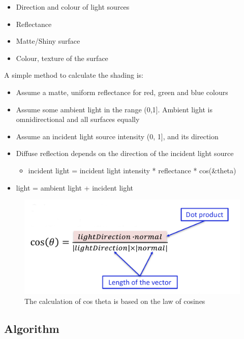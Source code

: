 \documentclass[
]{book}
\providecommand{\tightlist}{%
  \setlength{\itemsep}{0pt}\setlength{\parskip}{0pt}}
\begin{document}
\begin{itemize}
\tightlist
\item
  Direction and colour of light sources
\item
  Reflectance
\item
  Matte/Shiny surface
\item
  Colour, texture of the surface
\end{itemize}

A simple method to calculate the shading is:

\begin{itemize}
\tightlist
\item
  Assume a matte, {uniform reflectance} for red, green and blue colours
\item
  Assume some {ambient light} in the range (0,1{]}. Ambient light is omnidirectional and all surfaces equally
\item
  Assume an incident {light source} intensity (0, 1{]}, and its direction
\item
  Diffuse reflection depends on the direction of the incident light source

  \begin{itemize}
  \tightlist
  \item
    {incident light = incident light intensity * reflectance * cos(\&theta)}
  \end{itemize}
\item
  {light = ambient light + incident light}
\end{itemize}

\begin{figure}
\centering
\includegraphics{img/08-image28.png}
\caption{\label{fig:cos-theta}The calculation of cos theta is based on the law of cosines}
\end{figure}

\hypertarget{algorithm}{%
\subsection{Algorithm}\label{algorithm}}
\end{document}
